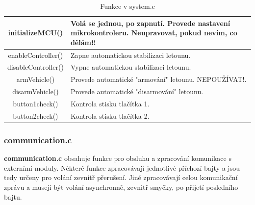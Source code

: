 \documentclass[11pt, a4paper]{article}
\begin{document}
\begin{table}
\begin{center}
\begin{tabular}{| c | p{8cm} |}
\hline
initializeMCU() & Volá se jednou, po zapnutí. Provede nastavení mikrokontroleru.
\newline \textbf{Neupravovat, pokud nevím, co dělám!!}\\
\hline
enableController() & Zapne automatickou stabilizaci letounu.\\
\hline
disableController() & Vypne automatickou stabilizaci letounu.\\
\hline
armVehicle() & Provede automatické "armování" letounu. NEPOUŽÍVAT!.\\
\hline
disarmVehicle() & Provede automatické "disarmování" letounu.\\
\hline
button1check() & Kontrola stisku tlačítka 1.\\
\hline
button2check() & Kontrola stisku tlačítka 2.\\
\hline
\end{tabular}
\caption{Funkce v system.c}
\label{tab:system.c}
\end{center}
\end{table}

\subsubsection{communication.c}

\textbf{communication.c} obsahuje funkce pro obsluhu a zpracování komunikace s externími moduly. Některé funkce zpracovávají jednotlivé příchozí bajty a jsou tedy určeny pro volání zevnitř přerušení. Jiné zpracovávají celou komunikační zprávu a musejí být volání asynchronně, zevnitř smyčky, po přijetí posledního bajtu.
\end{document}
